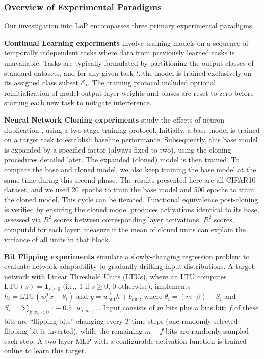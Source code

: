 \documentclass{article}
\numberwithin{figure}{section}
\begin{document}
\subsubsection{Overview of Experimental Paradigms}
\label{subsec:experiment_paradigms}

Our investigation into LoP encompasses three primary experimental paradigms.

\textbf{Continual Learning experiments} involve training models on a sequence of temporally independent tasks where data from previously learned tasks is unavailable. Tasks are typically formulated by partitioning the output classes of standard datasets, and for any given task $t$, the model is trained exclusively on its assigned class subset $\mathcal{C}_t$. The training protocol included optional reinitialization of model output layer weights and biases are reset to zero before starting each new task to mitigate interference.

\textbf{Neural Network Cloning experiments} study the effects of neuron duplication , using a two-stage training protocol. Initially, a base model is trained on a target task to establish baseline performance. Subsequently, this base model is expanded by a specified factor (always fixed to two), using the cloning procedures detailed later.  The expanded (cloned) model is then trained. To compare the base and cloned model, we also keep training the base model at the same time during this second phase. The results presented here are all CIFAR10 dataset, and we used 20 epochs to train the base model and 500 epochs to train the cloned model. This cycle can be iterated. Functional equivalence post-cloning is verified by ensuring the cloned model produces activations identical to its base, assessed via $R^2$ scores between corresponding layer activations. $R^2$ scores, computdd for each layer, measure if the mean of cloned units can explain the variance of all units in that block. 

\textbf{Bit Flipping experiments} simulate a slowly-changing regression problem to evaluate network adaptability to gradually drifting input distributions. A target network with Linear Threshold Units (LTUs), where an LTU computes $\text{LTU}(s) = \mathbf{1}_{s \ge 0}$ (i.e., 1 if $s \ge 0$, 0 otherwise), implements $h_i = \text{LTU}(w_i^T x - \theta_i)$ and $y = w_{\text{out}}^T h + b_{\text{out}}$, where $\theta_i = (m \cdot \beta) - S_i$ and $S_i = \sum_{j: w_{ij} < 0} 1 - 0.5 \cdot w_{i,m+1}$. Input consists of $m$ bits plus a bias bit; $f$ of these bits are ``flipping bits'' changing every $T$ time steps (one randomly selected flipping bit is inverted), while the remaining $m-f$ bits are randomly sampled each step. A two-layer MLP with a configurable activation function is trained online to learn this target. %
\end{document}
